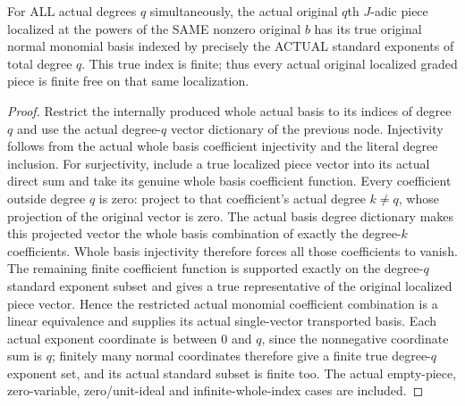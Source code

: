 \begin{theorem}
\label{hir:relative-normal-localgraded-every-piece-basis}
\leanok
{}
For ALL actual degrees $q$ simultaneously, the actual original $q$th $J$-adic
piece localized at the powers of the SAME nonzero original $b$ has its true
original normal monomial basis indexed by precisely the ACTUAL standard
exponents of total degree $q$. This true index is finite; thus every actual
original localized graded piece is finite free on that same localization.
\end{theorem}
\begin{proof}
Restrict the internally produced whole actual basis to its indices of degree
$q$ and use the actual degree-$q$ vector dictionary of the previous node.
Injectivity follows from the actual whole basis coefficient injectivity and
the literal degree inclusion. For surjectivity, include a true localized
piece vector into its actual direct sum and take its genuine whole basis
coefficient function. Every coefficient outside degree $q$ is zero:
project to that coefficient's actual degree $k\ne q$, whose projection of
the original vector is zero. The actual basis degree dictionary makes this
projected vector the whole basis combination of exactly the degree-$k$
coefficients. Whole basis injectivity therefore forces all those coefficients
to vanish. The remaining finite coefficient function is supported exactly
on the degree-$q$ standard exponent subset and gives a true representative
of the original localized piece vector. Hence the restricted actual
monomial coefficient combination is a linear equivalence and supplies its
actual single-vector transported basis. Each actual exponent coordinate is
between $0$ and $q$, since the nonnegative coordinate sum is $q$; finitely
many normal coordinates therefore give a finite true degree-$q$ exponent
set, and its actual standard subset is finite too. The actual empty-piece,
zero-variable, zero/unit-ideal and infinite-whole-index cases are included.
\end{proof}

